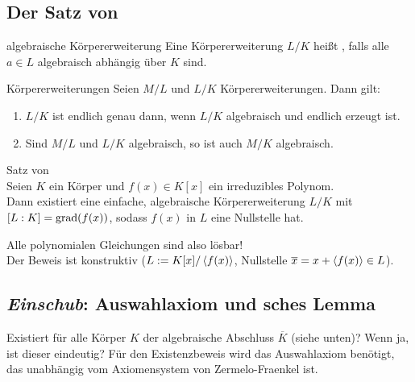 \pagebreak

\subsection{%
    Der Satz von %
}

\begin{Def}{algebraische Körpererweiterung}
    Eine Körpererweiterung $L/K$ heißt , falls alle
    $a \in L$ algebraisch abhängig über $K$ sind.
\end{Def}

\begin{Prop}{Körpererweiterungen}
    Seien $M/L$ und $L/K$ Körpererweiterungen. Dann gilt:
    \begin{enumerate}[label=(\alph*)]
        \item
        $L/K$ ist endlich genau dann, wenn $L/K$ algebraisch
        und endlich erzeugt ist.
        
        \item
        Sind $M/L$ und $L/K$ algebraisch, so ist auch $M/K$ algebraisch.
    \end{enumerate}
\end{Prop}

\begin{Theorem}{Satz von \upshape\,\!}\\
    Seien $K$ ein Körper und $f(x) \in K[x]$ ein irreduzibles Polynom.\\
    Dann existiert eine einfache, algebraische Körpererweiterung $L/K$ mit
    $[L:K] = \operatorname{grad}(f(x))$, sodass $f(x)$ in $L$ eine Nullstelle hat.
\end{Theorem}

\begin{Bem}
    Alle polynomialen Gleichungen sind also lösbar!\\
    Der Beweis ist konstruktiv ($L := K[x]/\left\langle f(x)\right\rangle$,
    Nullstelle $\overline{x} = x + \left\langle f(x)\right\rangle \in L$).
\end{Bem}

\subsection{%
    \emph{Einschub}: Auswahlaxiom und sches Lemma%
}

\begin{Bem}
    Existiert für alle Körper $K$ der algebraische Abschluss $\overline{K}$
    (siehe unten)?
    Wenn ja, ist dieser eindeutig?
    Für den Existenzbeweis wird das Auswahlaxiom benötigt, das unabhängig
    vom Axiomensystem von Zermelo-Fraenkel ist.
\end{Bem}

